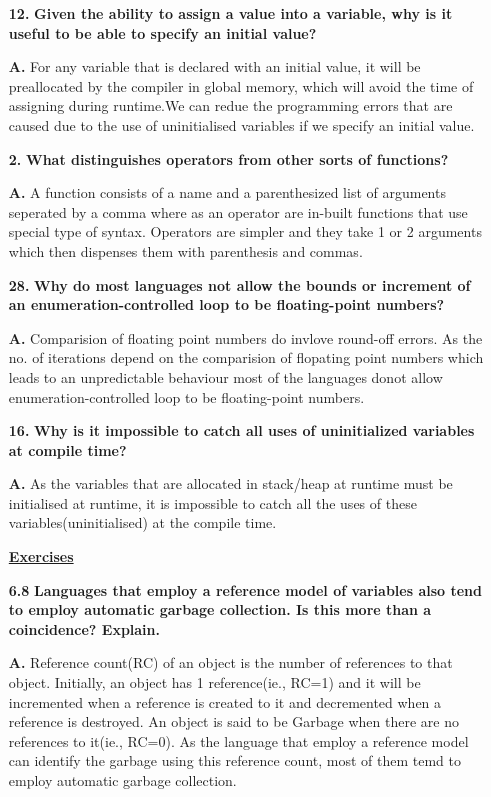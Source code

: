\documentclass[letterpaper]{article}
\begin{document}
\begin{large}
\begin{flushleft}
\begin{enumerate}
\item[\textbf{12.}]
\textbf{Given the ability to assign a value into a variable, why is it useful to be able to specify an initial value?}
\item[\textbf{A.}]
For any variable that is declared with an initial value, it will be preallocated by the compiler in global memory, which will avoid the time of assigning during runtime.We can redue the programming errors that are caused due to the use of uninitialised variables if we specify an initial value.\\[0.2in]

\item[\textbf{2.}]
\textbf{What distinguishes operators from other sorts of functions?}
\item[\textbf{A.}]
A function consists of a name and a parenthesized list of arguments seperated by a comma where as an operator are in-built functions that use special type of syntax. Operators are simpler and they take 1 or 2 arguments which then dispenses them with parenthesis and commas.\\[0.2in]

\item[\textbf{28.}]
\textbf{Why do most languages not allow the bounds or increment of an enumeration-controlled loop to be floating-point numbers?}
\item[\textbf{A.}]
Comparision of floating point numbers do invlove round-off errors. As the no. of iterations depend on the comparision of flopating point numbers which leads to an unpredictable behaviour most of the languages donot allow enumeration-controlled loop to be floating-point numbers.\\[0.2in]

\item[\textbf{16.}]
\textbf{Why is it impossible to catch all uses of uninitialized variables at compile time?}
\item[\textbf{A.}]
As the variables that are allocated in stack/heap at runtime must be initialised at runtime, it is impossible to catch all the uses of these variables(uninitialised) at the compile time.\\[0.2in]

\pagebreak
 
\underline{\textbf{Exercises }}\\[0.2in]

\item[\textbf{6.8}]
\textbf{Languages that employ a reference model of variables also tend to employ automatic garbage collection. Is this more than a coincidence? Explain.}
\item[\textbf{A.}]
Reference count(RC) of an object is the number of references to that object. Initially, an object has 1 reference(ie., RC=1) and it will be incremented when a reference is created to it and decremented when a reference is destroyed. An object is said to be Garbage when there are no references to it(ie., RC=0). As the language that employ a reference model can identify the garbage using this reference count, most of them temd to employ automatic garbage collection.\\[0.2in]
  

\end{enumerate}
\end{flushleft}
\end{large}
\end{document}
